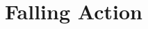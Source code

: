 \documentclass[draft]{article}
\begin{document}
\section{Falling Action} %
\begin{comment}
\begin{theorem}
    Let $\lambda_i\ge\mu_i$ be dominant ($i=1,2$), $\mu = \mu' +\mu''$, and $\lambda =\lambda'+\lambda''$. 
    There is an isomorphism 
    \begin{equation}
        \overline{\OO}_{\lambda',\lambda''}\cap\TT_{\mu',\mu''} \to \overline\Gr_\AA^{\lambda',\lambda''}\cap \cW_{\mu',\mu''}
    \end{equation}
    got by taking a $\mu\times\mu$ block matrix $A$ in the $s$-fibre $\overline{\OO_{\lambda',\lambda''}^s}\cap\TT_{\mu',\mu''}^s$ on the left to the representative of the $s$-fibre on the right defined by  
    \begin{equation}
        \begin{split}
            g &= t^{\mu'} (t-s)^{\mu''} + a(t) \\
            a_{ij}(t) &= - \sum_{k=1}^{\mu_i} A^k_{ji} t^{k-1}
        \end{split}
    \end{equation}
    where $A^k_{ji}$ is the $k$th entry from the left of the last row of the $\mu_j\times\mu_i$ block of $A$. 
\end{theorem}

Let's call this the MVyBD isomorphism.

\begin{proof}
    The proof is fibre by fibre, so fix $s\ne 0$. \acom{Emphasize in the intro later (because this always confuses me) that by the $s$-fibre we really mean the $(0,s)$-fibre; i.e.\ its the BD Grassmannian over the second symmetric power of $C = \AA^1$; better just replace $s$-fibre by $(0,s)$-fibre everywhere it occurs.}
    \begin{enumerate}
        \item The map is well defined. In particular, it defines $\CC[t]$-lattices in $\CC(t)^m$. Moreover, these lattices break down to give pairs of lattices upon inverting $t$ or $t-s$ that have the right properties. [Copy Roger's proof]
        \item The inverse map is got by taking the matrix of multiplication by $t$.  More precisely, let $ L \in Gr^{BD} \cap \cW_\mu$.  We work with the quotient $\CC[t]^m/L$ just as in the ordinary MVy isomorphism---the only difference being $\CC\xt$ is replaced by $\CC[t]$.
\begin{enumerate}
    \item 
    We claim that 
    \begin{equation}
        \{[e_i],[te_i],\dots,[t^{\mu_{i}-1}e_i] : 1\le i \le m\}
    \end{equation}
    is a $\CC$-basis of $\CC[t]^m/L$.
    

\end{comment}
\end{document}
